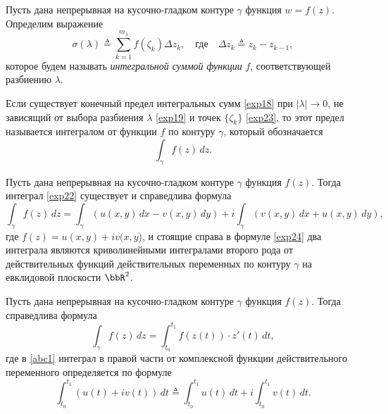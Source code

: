 \begin{defn}
\label{omg}
Пусть дана непрерывная на кусочно-гладком контуре $\gamma$ функция $w=f(z)$. Определим выражение
\begin{equation}
\label{exp18}
\sigma(\lambda) \triangleq \sum\limits_{k=1}^{m_{\lambda}} f(\zeta_k)\Delta z_k, \quad\text{где}\quad \Delta z_k \triangleq z_k - z_{k-1},
\end{equation}
которое будем называть \textit{интегральной суммой функции} $f$, соответствующей разбиению $\lambda$.
\end{defn}

Если существует конечный предел интегральных сумм \eqref{exp18} при $|\lambda| \to 0$, не зависящий от выбора разбиения $\lambda$ \eqref{exp19} и точек $\{\zeta_k\}$ \eqref{exp23}, то этот предел называется интегралом от функции $f$ по контуру $\gamma$, который обозначается
\begin{equation}
\label{exp22}
\int_\gamma f(z)\,dz.
\end{equation}

\begin{thm}
\label{exp21}
Пусть дана непрерывная на кусочно-гладком контуре $\gamma$ функция $f(z)$. Тогда интеграл \eqref{exp22} существует и справедлива формула
\begin{equation}
\label{exp24}
\int _\gamma f(z) \,dz = \int _\gamma(u(x,y)\,dx - v(x,y)\,dy)+i\int_\gamma (v(x,y)\,dx +u(x,y)\,dy),
\end{equation}
где $f(z) = u(x, y)+ iv(x, y$), и стоящие справа в формуле \eqref{exp24} два интеграла являются криволинейными интегралами второго рода от действительных функций действительных переменных по контуру $\gamma$ на евклидовой плоскости $\bbR^2$.
\end{thm}


\begin{cons}
Пусть дана непрерывная на кусочно-гладком контуре $\gamma$ функция $f(z)$. Тогда справедлива формула 
\begin{equation}
\label{abc1}
\int _\gamma f(z) \,dz = \int _{t_0}^{t_1} f(z(t))\cdot z'(t) \,dt,
\end{equation}
где в \eqref{abc1} интеграл в правой части от комплексной функции действительного переменного определяется по формуле
\begin{equation}
\label{kek2}
\int _{t_0}^{t_1}(u(t)+iv(t)) \,dt \triangleq \int _{t_0}^{t_1}u(t) \,dt + i \int _{t_0}^{t_1}v(t) \,dt.
\end{equation}
\end{cons}



